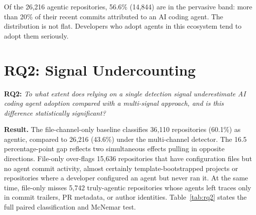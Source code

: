 Of the 26,216 agentic repositories, 56.6\% (14,844) are in the pervasive band: more than 20\% of their recent commits attributed to an AI coding agent. The distribution is not flat. Developers who adopt agents in this ecosystem tend to adopt them seriously.

\section{RQ2: Signal Undercounting}
\label{sec:res:rq2}

\textbf{RQ2:} \textit{To what extent does relying on a single detection signal underestimate AI coding agent adoption compared with a multi-signal approach, and is this difference statistically significant?}

\medskip

\noindent\textbf{Result.} The file-channel-only baseline classifies 36,110 repositories (60.1\%) as agentic, compared to 26,216 (43.6\%) under the multi-channel detector. The 16.5 percentage-point gap reflects two simultaneous effects pulling in opposite directions. File-only over-flags 15,636 repositories that have configuration files but no agent commit activity, almost certainly template-bootstrapped projects or repositories where a developer configured an agent but never ran it. At the same time, file-only misses 5,742 truly-agentic repositories whose agents left traces only in commit trailers, PR metadata, or author identities. Table~\ref{tab:rq2} states the full paired classification and McNemar test.

